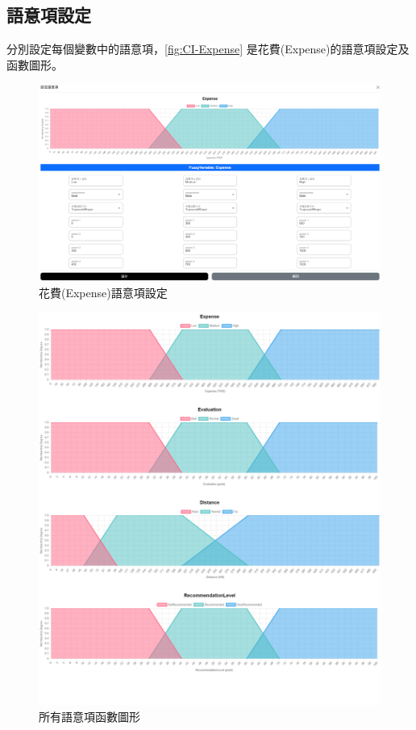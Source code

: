 \subsection{語意項設定}
分別設定每個變數中的語意項，\autoref{fig:CI-Expense} 是花費(Expense)的語意項設定及函數圖形。
\begin{figure}[htbp!]
    \centering
    \includegraphics[width=0.5\linewidth]{images/w4/CI_knowledge_setting.png}
    \caption{花費(Expense)語意項設定}
    \label{fig:CI-Expense}
\end{figure}
\begin{figure}[htbp!]
    \centering
    \includegraphics[width=0.5\linewidth]{images/w4/all.png}
    \caption{所有語意項函數圖形}
    \label{fig:all-function}
\end{figure}
\newpage
